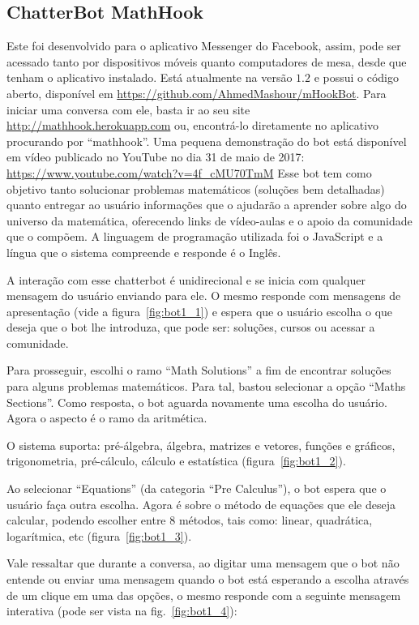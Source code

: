 \subsection{ChatterBot MathHook}\label{subsec:bot1}


Este foi desenvolvido para o aplicativo Messenger do Facebook, assim, pode ser acessado tanto por dispositivos móveis quanto computadores de mesa, desde que tenham o aplicativo instalado. Está atualmente na versão $1.2$ e possui o código aberto, disponível em \url{https://github.com/AhmedMashour/mHookBot}.
Para iniciar uma conversa com ele, basta ir ao seu site \url{http://mathhook.herokuapp.com} ou, encontrá-lo diretamente no aplicativo procurando por ``mathhook''.
Uma pequena demonstração do bot está disponível em vídeo publicado no YouTube no dia 31 de maio de 2017: \url{https://www.youtube.com/watch?v=4f_cMU70TmM}
Esse bot tem como objetivo tanto solucionar problemas matemáticos (soluções bem detalhadas) quanto entregar ao usuário informações que o ajudarão a aprender sobre algo do universo da matemática, oferecendo links de vídeo-aulas e o apoio da comunidade que o compõem.
A linguagem de programação utilizada foi o JavaScript e a língua que o sistema compreende e responde é o Inglês.

A interação com esse chatterbot é unidirecional e se inicia com qualquer mensagem do usuário enviando para ele.
O mesmo responde com mensagens de apresentação (vide a figura~\ref{fig:bot1_1}) e espera que o usuário escolha o que deseja que o bot lhe introduza, que pode ser: soluções, cursos ou acessar a comunidade.


Para prosseguir, escolhi o ramo ``Math Solutions'' a fim de encontrar soluções para alguns problemas matemáticos.
Para tal, bastou selecionar a opção ``Maths Sections''. Como resposta, o bot aguarda novamente uma escolha do usuário. Agora o aspecto é o ramo da aritmética.

O sistema suporta: pré-álgebra, álgebra, matrizes e vetores, funções e gráficos, trigonometria, pré-cálculo, cálculo e estatística (figura~\ref{fig:bot1_2}). 

Ao selecionar ``Equations'' (da categoria ``Pre Calculus''), o bot espera que o usuário faça outra escolha. Agora é sobre o método de equações que ele deseja calcular, podendo escolher entre 8 métodos, tais como: linear, quadrática, logarítmica, etc (figura~\ref{fig:bot1_3}).


Vale ressaltar que durante a conversa, ao digitar uma mensagem que o bot não entende ou enviar uma mensagem quando o bot está esperando a escolha através de um clique em uma das opções, o mesmo responde com a seguinte mensagem interativa (pode ser vista na fig.~\ref{fig:bot1_4}):
\begin{description}
    \item {}
    \item {}
\end{description}

